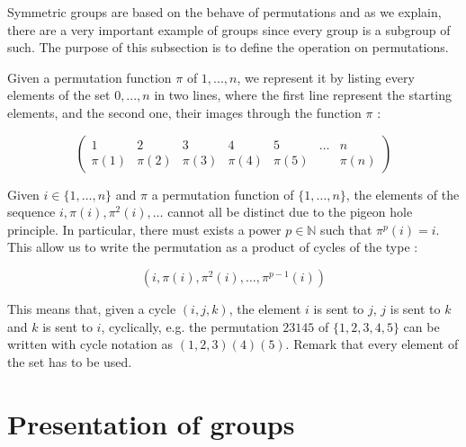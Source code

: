 
Symmetric groups are based on the behave of permutations and as we explain, there are a very important example of groups since every group is a subgroup of such. The purpose of this subsection is to define the operation on permutations.


\begin{definition}
Given a permutation function $\pi$ of ${1,...,n}$, we represent it by listing every elements of the set ${0,...,n}$ in two lines, where the first line represent the starting elements, and the second one, their images through the function $\pi$ :

\begin{equation}
  \begin{pmatrix}
   1 & 2 & 3 & 4 & 5 & \dots & n \\
   \pi(1) & \pi(2) & \pi(3) & \pi(4) & \pi(5) & \ & \pi(n)
 \end{pmatrix}
\end{equation}

\end{definition}


\begin{definition}Given $i \in \{1,\dots,n\}$ and $\pi$ a permutation function of $\{1,\dots,n\}$, the elements of the sequence $i, \pi(i), \pi^2(i),\dots$ cannot all be distinct due to the pigeon hole principle. In particular, there must exists a power $p \in \mathbb{N}$ such that $\pi^p(i) = i$. This allow us to write the permutation as a product of cycles of the type :

\begin{equation}
  (i, \pi(i), \pi^2(i), \dots, \pi^{p-1}(i))
\end{equation}
\end{definition}

This means that, given a cycle $(i,j,k)$, the element $i$ is sent to $j$, $j$ is sent to $k$ and $k$ is sent to $i$, cyclically, e.g. the permutation $23145$ of $ \{1,2,3,4,5\}$ can be written with cycle notation as $(1,2,3)(4)(5)$. Remark that every element of the set has to be used.

\section{Presentation of groups}
\label{sec:pres_group}

